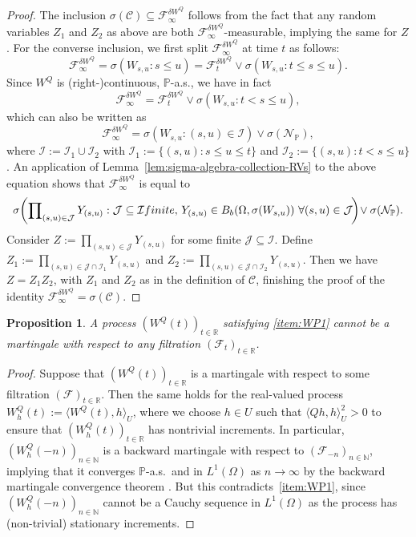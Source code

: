 \documentclass[reqno]{amsart}
\numberwithin{equation}{section}
\newcommand{\bbP}{\mathbb{P}}
\newcommand{\bbR}{\mathbb{R}}
\newcommand{\N}{\mathbb{N}}
\newcommand{\cF}{\mathcal{F}}
\newcommand{\cI}{\mathcal{I}}
\newcommand{\cJ}{\mathcal{J}}
\newcommand{\cN}{\mathcal{N}}
\newcommand{\scalar}[2]{     \langle #1       \rangle_{ #2 }}
\newtheorem{proposition}[lemma]{Proposition}
\theoremstyle{remark}
\theoremstyle{definition}
\begin{document}
\begin{proof}
	The inclusion $\sigma(\mathscr C) \subseteq \cF^{\delta W^Q}_{\infty}$
	follows from the fact that any random variables $Z_1$ and $Z_2$ as above
	are both $\cF^{\delta W^Q}_{\infty}$-measurable,
	implying the same for $Z$.
	For the converse inclusion, we first split $\cF_\infty^{\delta W^Q}$ at time $t$
	as follows:
	\begin{equation}\label{eq:Finfty-join-at-t}
		\cF^{\delta W^Q}_{\infty} 
		= 
		\sigma(W_{s,u} : s \le u)
		=
		\cF_t^{\delta W^Q} \vee \sigma(W_{s,u} : t \le s \le u).
	\end{equation}
	Since $W^Q$ is (right-)continuous, $\bbP$-a.s., we have in fact
	\[
	\cF^{\delta W^Q}_{\infty} 
	=
	\cF_t^{\delta W^Q} \vee \sigma(W_{s,u} : t < s \le u),
	\]
	which can also be written as
	\[
	\cF_\infty^{\delta W^Q} = \sigma(W_{s,u} : (s, u) \in \cI) \vee \sigma(\cN_{\bbP}),
	\]
	where 
	$\cI := \cI_1 \cup \cI_2$
	with
	$\cI_1 := \{(s,u) : s \le u \le t \}$ and
	$\cI_2 := \{(s,u) :  t < s \le u\}$.
	An application of Lemma~\ref{lem:sigma-algebra-collection-RVs}
	to the above equation shows that $\cF_{\infty}^{\delta W^Q}$ is equal to
	\[
	\sigma\biggl( 
	\prod\nolimits_{(s,u) \in \cJ} Y_{(s,u)} 
	: 
	\cJ \subseteq \cI \textup{ finite}, \,
	Y_{(s,u)} \in B_b(\Omega, \sigma(W_{s,u})) \,\,
	\forall (s,u) \in \cJ\!
	\biggr)\! 
	\vee 
	\sigma(\cN_{\bbP}).
	\]
	Consider
	$Z := \prod_{(s,u) \in \cJ} Y_{(s,u)}$
	for some finite $\cJ \subseteq \cI$.
	Define
	$Z_1 :=  \prod_{(s,u) \in \cJ \cap \cI_1} Y_{(s,u)}$
	and $Z_2 := \prod_{(s,u) \in \cJ \cap \cI_2} Y_{(s,u)}$.
	Then we have $Z = Z_1 Z_2$, with $Z_1$ and $Z_2$
	as in the definition of $\mathscr C$, finishing the proof of the identity
	$\cF_\infty^{\delta W^Q} = \sigma(\mathscr C)$.
\end{proof}

\begin{proposition}\label{prop:WP-R-not-martingale}
	A process
	$(W^Q(t))_{t\in \bbR}$ satisfying 
	\textup{\ref{item:WP1}} cannot be a martingale with respect to any filtration $(\cF_t)_{t\in\bbR}$.
\end{proposition}
%
\begin{proof}
	Suppose that $(W^Q(t))_{t\in \bbR}$ is a martingale with respect to some filtration $(\cF)_{t\in\bbR}$.
	Then the same holds for the real-valued process $W_h^Q(t) := \scalar{W^Q(t), h}{U}$,
	where we choose $h \in U$ such that $\scalar{Qh,h}{U}^2 > 0$
	to ensure that $(W_h^Q(t))_{t\in\bbR}$ has nontrivial increments.
	In particular, $(W^Q_h(-n))_{n \in \N}$ is a backward martingale
	with respect to $(\cF_{-n})_{n \in \N}$, implying that
	it
	converges $\bbP$-a.s.\ and in $L^1(\Omega)$ as $n \to \infty$ 
	by the backward martingale convergence theorem \cite[Section~{12.7}, Theorem~4]{GrimmettStirzaker2001}. 
	But this contradicts~\ref{item:WP1}, since $(W^Q_h(-n))_{n \in \N}$
	cannot be a Cauchy sequence in $L^1(\Omega)$ as the process
	has (non-trivial) stationary increments.
\end{proof}
\end{document}

